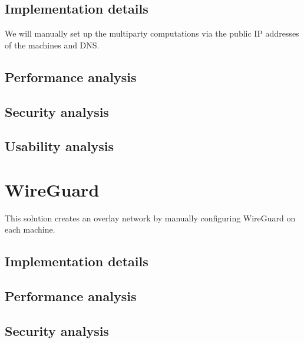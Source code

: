 \hypertarget{implementation-details}{%
\section{Implementation details}\label{implementation-details}}

We will manually set up the multiparty computations via the public IP
addresses of the machines and DNS.

\hypertarget{performance-analysis}{%
\section{Performance analysis}\label{performance-analysis}}

\hypertarget{security-analysis}{%
\section{Security analysis}\label{security-analysis}}

\hypertarget{usability-analysis}{%
\section{Usability analysis}\label{usability-analysis}}

\hypertarget{wireguard}{%
\chapter{WireGuard}\label{wireguard}}

This solution creates an overlay network by manually configuring
WireGuard on each machine.

\hypertarget{implementation-details}{%
\section{Implementation details}\label{implementation-details}}

\hypertarget{performance-analysis}{%
\section{Performance analysis}\label{performance-analysis}}

\hypertarget{security-analysis}{%
\section{Security analysis}\label{security-analysis}}

